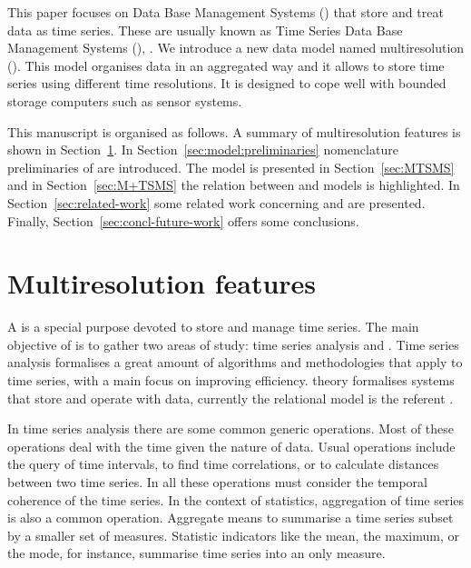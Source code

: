 
This paper focuses on Data Base Management Systems \linebreak[4]
() that store and treat data as time series. These are
usually known as Time Series Data Base Management Systems
(), \cite{dreyer94}.  We introduce a new data model named
multiresolution  (). This model organises data
in an aggregated way and it allows to store time series using
different time resolutions. It is designed to cope well with bounded
storage computers such as sensor systems.




This manuscript is organised as follows.  A summary of multiresolution
features is shown in Section~\ref{sec:features}. In
Section~\ref{sec:model:preliminaries} nomenclature preliminaries of
 are introduced. The  model is presented in
Section~\ref{sec:MTSMS} and in Section~\ref{sec:M+TSMS} the relation
between  and  models is highlighted.
In Section~\ref{sec:related-work} some related work concerning
 and  are presented. Finally,
Section~\ref{sec:concl-future-work} offers some conclusions.



\section{Multiresolution features}
\label{sec:features}

A  is a special purpose  devoted to store and
manage time series.  The main objective of  is to gather
two areas of study: time series analysis and .  Time series
analysis formalises a great amount of algorithms and methodologies
that apply to time series, with a main focus on improving
efficiency.  theory formalises systems that store and
operate with data, currently the relational model is the referent
\cite{date:introduction}.

In time series analysis there are some common generic operations.
Most of these operations deal with the time given the nature of data.
Usual operations include the query of time intervals, to find time
correlations, or to calculate distances between two time series. In
all these operations  must consider the temporal coherence
of the time series.  In the context of statistics, aggregation of time
series is also a common operation. Aggregate means to summarise a time
series subset by a smaller set of measures. Statistic indicators like
the mean, the maximum, or the mode, for instance, summarise time
series into an only measure.

